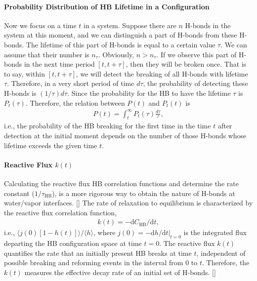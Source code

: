 \paragraph{Probability Distribution of HB Lifetime in a Configuration}
Now we focus on a time $t$ in a system. Suppose there are $n$ H-bonds in the system at this moment, and we can distinguish a part of H-bonds from these H-bonds. 
The lifetime of this part of H-bonds is equal to a certain value $\tau$. We can assume that their number is $n_\tau$. 
Obviously, $n>n_\tau$. If we observe this part of H-bonds in the next time period $[t, t+\tau]$, then they will be broken once. 
That is to say, within $[t,t+\tau]$, we will detect the breaking of all H-bonds with lifetime $\tau$. 
Therefore, in a very short period of time $d\tau$, the probability of detecting these H-bonds is $(1/\tau)d\tau$.
Since the probability for the HB to have the lifetime $\tau$ is $P_t(\tau)$. Therefore, the relation between $P(t)$ and $P_t(t)$ is
\begin{eqnarray}
P(t) = \int_t^\infty P_t(\tau)\frac{d\tau}{\tau},
\label{eq:Pt_and_P}
\end{eqnarray}
i.e., the probability of the HB breaking for the first time in the time $t$ after detection at the initial moment depends on 
the number of those H-bonds whose lifetime exceeds the given time $t$. \cite{VPV09}

%
\paragraph{Reactive Flux $k(t)$} 
Calculating the reactive flux HB correlation functions and determine the rate constant ($1/\tau_{\text{HB}}$),
is a more rigorous way to obtain the nature of H-bonds at water/vapor interfaces. [\cite{AL00}]
The rate of relaxation to equilibrium is characterized by the reactive flux correlation function, 
\begin{eqnarray}
k(t) = -\text{d}C_{\text{HB}}/\text{d}t,
\label{eq:k}
\end{eqnarray}
i.e., $\langle j(0)[1-h(t)]\rangle/\langle h\rangle$,
where 
$j(0)=-\text{d}h/\text{d}t|_{t=0}$ 
is the integrated flux departing the HB configuration space at time $t=0$.
The reactive flux $k(t)$ quantifies the rate that an initially present HB breaks at time $t$, 
independent of possible breaking and reforming events in the interval from 0 to $t$.
Therefore, the $k(t)$ measures the effective decay rate of an 
initial set of H-bonds. [\cite{DC87,FWS00}]

